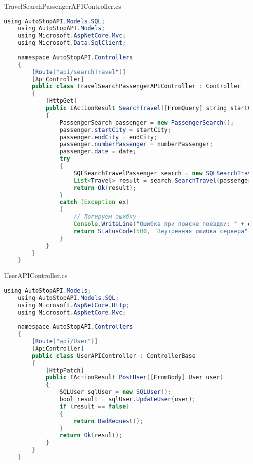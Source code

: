 TravelSearchPassengerAPIController.cs
\begin{lstlisting}[language=Java]
	using AutoStopAPI.Models.SQL;
	using AutoStopAPI.Models;
	using Microsoft.AspNetCore.Mvc;
	using Microsoft.Data.SqlClient;
	
	namespace AutoStopAPI.Controllers
	{
		[Route("api/searchTravel")]
		[ApiController]
		public class TravelSearchPassengerAPIController : Controller
		{
			[HttpGet]
			public IActionResult SearchTravel([FromQuery] string startCity, string endCity, int numberPassenger, DateOnly date)
			{
				PassengerSearch passenger = new PassengerSearch();
				passenger.startCity = startCity;
				passenger.endCity = endCity;
				passenger.numberPassenger = numberPassenger;
				passenger.date = date;
				try
				{
					SQLSearchTravelPassenger search = new SQLSearchTravelPassenger();
					List<Travel> result = search.SearchTravel(passenger);
					return Ok(result);
				}
				catch (Exception ex)
				{
					// Логируем ошибку
					Console.WriteLine("Ошибка при поиске поездки: " + ex.Message);
					return StatusCode(500, "Внутренняя ошибка сервера");
				}
			}
		}
	}
\end{lstlisting}

UserAPIController.cs
\begin{lstlisting}[language=Java]
	using AutoStopAPI.Models;
	using AutoStopAPI.Models.SQL;
	using Microsoft.AspNetCore.Http;
	using Microsoft.AspNetCore.Mvc;
	
	namespace AutoStopAPI.Controllers
	{
		[Route("api/User")]
		[ApiController]
		public class UserAPIController : ControllerBase
		{
			[HttpPatch]
			public IActionResult PostUser([FromBody] User user)
			{
				SQLUser sqlUser = new SQLUser();
				bool result = sqlUser.UpdateUser(user);
				if (result == false) 
				{
					return BadRequest();
				}
				return Ok(result);
			}
		}
	}
\end{lstlisting}

\fi

